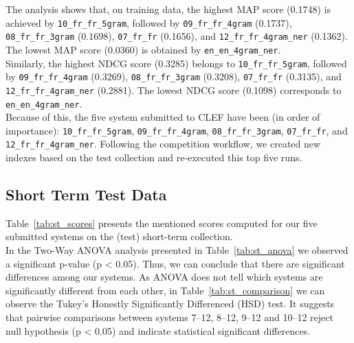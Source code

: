 
The analysis shows that, on training data, the highest MAP score (0.1748) is achieved by \texttt{10\_fr\_fr\_5gram},
followed by
\texttt{09\_fr\_fr\_4gram} (0.1737),
\texttt{08\_fr\_fr\_3gram} (0.1698),
\texttt{07\_fr\_fr} (0.1656), and
\texttt{12\_fr\_fr\_4gram\_ner} (0.1362).
The lowest MAP score (0.0360) is obtained by \texttt{en\_en\_4gram\_ner}.\\

Similarly, the highest NDCG score (0.3285) belongs to \texttt{10\_fr\_fr\_5gram}, followed by
\texttt{09\_fr\_fr\_4gram} (0.3269),
\texttt{08\_fr\_fr\_3gram} (0.3208),
\texttt{07\_fr\_fr} (0.3135), and
\texttt{12\_fr\_fr\_4gram\_ner} (0.2881).
The lowest NDCG score (0.1098) corresponds to \texttt{en\_en\_4gram\_ner}.\\

Because of this, the five system submitted to CLEF have been (in order of importance): \texttt{10\_fr\_fr\_5gram},
\texttt{09\_fr\_fr\_4gram}, \texttt{08\_fr\_fr\_3gram}, \texttt{07\_fr\_fr}, and \texttt{12\_fr\_fr\_4gram\_ner}.
Following the competition workflow, we created new indexes based on the test collection and re-executed this top five
runs.\\


\subsection{Short Term Test Data}\label{subsec:short_term}

Table~\ref{tab:st_scores} presents the mentioned scores computed for our five submitted systems on the (test)
short-term collection.\\

In the Two-Way ANOVA analysis presented in Table~\ref{tab:st_anova} we observed a significant p-value (p < 0.05).
Thus, we can conclude that there are significant differences among our systems.
As ANOVA does not tell which systems are significantly different from each other, in Table~\ref{tab:st_comparison} we
can observe the Tukey’s Honestly Significantly Differenced (HSD) test.
It suggests that pairwise comparisons between systems 7--12, 8--12, 9--12 and 10--12 reject null hypothesis (p < 0.05)
and indicate statistical significant differences.

